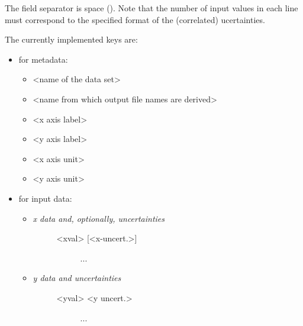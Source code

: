 \documentclass[a4paper,10pt,english]{sphinxmanual}
\begin{document}
\begin{fulllineitems}
The field separator is space (). Note that the number of input
values in each line must correspond to the specified format of the
(correlated) ucertainties.

The currently implemented keys are:
\begin{itemize}
\item {} 
for metadata:
\begin{itemize}
\item {} 
     \textless{}name of the data set\textgreater{}

\item {} 
  \textless{}name from which output file names are derived\textgreater{}

\item {} 
    \textless{}x axis label\textgreater{}

\item {} 
    \textless{}y axis label\textgreater{}

\item {} 
      \textless{}x axis unit\textgreater{}

\item {} 
      \textless{}y axis unit\textgreater{}

\end{itemize}

\item {} 
for input data:
\begin{itemize}
\item {} \begin{description}
\item[{     \emph{x data and, optionally, uncertainties}}] \leavevmode\begin{description}
\item[{\textless{}xval\textgreater{}  {[}\textless{}x-uncert.\textgreater{}{]}}] \leavevmode
...

\end{description}

\end{description}

\item {} \begin{description}
\item[{     \emph{y data and uncertainties}}] \leavevmode\begin{description}
\item[{\textless{}yval\textgreater{}  \textless{}y uncert.\textgreater{}}] \leavevmode
...


\end{description}
\end{description}
\end{itemize}
\end{itemize}
\end{fulllineitems}
\end{document}
